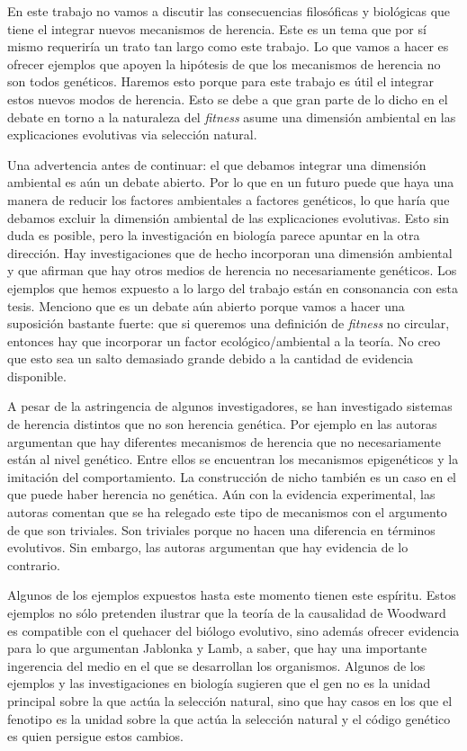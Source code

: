 En este trabajo no vamos a discutir las consecuencias filosóficas y biológicas que tiene el integrar nuevos mecanismos de herencia. Este es un tema que por sí mismo requeriría un trato tan largo como este trabajo. Lo que vamos a hacer es ofrecer ejemplos que apoyen la hipótesis de que los mecanismos de herencia no son todos genéticos. Haremos esto porque para este trabajo es útil el integrar estos nuevos modos de herencia. Esto se debe a que gran parte de lo dicho en el debate en torno a la naturaleza del \emph{fitness} asume una dimensión ambiental en las explicaciones evolutivas via selección natural.

Una advertencia antes de continuar: el que debamos integrar una dimensión ambiental es aún un debate abierto. Por lo que en un futuro puede que haya una manera de reducir los factores ambientales a factores genéticos, lo que haría que debamos excluir la dimensión ambiental de las explicaciones evolutivas. Esto sin duda es posible, pero la investigación en biología parece apuntar en la otra dirección. Hay investigaciones que de hecho incorporan una dimensión ambiental y que afirman que hay otros medios de herencia no necesariamente genéticos. Los ejemplos que hemos expuesto a lo largo del trabajo están en consonancia con esta tesis. Menciono que es un debate aún abierto porque vamos a hacer una suposición bastante fuerte: que si queremos una definición de \emph{fitness} no circular, entonces hay que incorporar un factor ecológico/ambiental a la teoría. No creo que esto sea un salto demasiado grande debido a la cantidad de evidencia disponible.

A pesar de la astringencia de algunos investigadores, se han investigado sistemas de herencia distintos que no son herencia genética. Por ejemplo en \cite{Jablonka2020} las autoras argumentan que hay diferentes mecanismos de herencia que no necesariamente están al nivel genético. Entre ellos se encuentran los mecanismos epigenéticos y la imitación del comportamiento. La construcción de nicho también es un caso en el que puede haber herencia no genética. Aún con la evidencia experimental, las autoras comentan que se ha relegado este tipo de mecanismos con el argumento de que son triviales. Son triviales porque no hacen una diferencia en términos evolutivos. Sin embargo, las autoras argumentan que hay evidencia de lo contrario.

Algunos de los ejemplos expuestos hasta este momento tienen este espíritu. Estos ejemplos no sólo pretenden ilustrar que la teoría de la causalidad de Woodward es compatible con el quehacer del biólogo evolutivo, sino además ofrecer evidencia para lo que argumentan Jablonka y Lamb, a saber, que hay una importante ingerencia del medio en el que se desarrollan los organismos. Algunos de los ejemplos y las investigaciones en biología sugieren que el gen no es la unidad principal sobre la que actúa la selección natural, sino que hay casos en los que el fenotipo es la unidad sobre la que actúa la selección natural y el código genético es quien persigue estos cambios.


